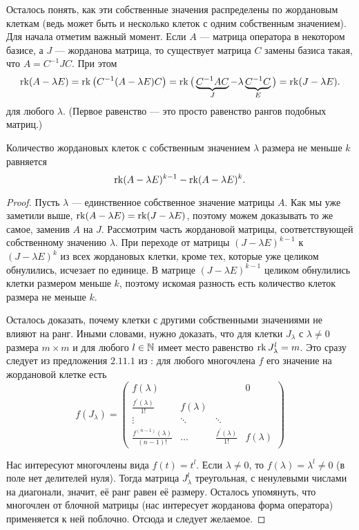 Осталось понять, как эти собственные значения распределены по жордановым клеткам (ведь может быть и несколько клеток с одним собственным значением). Для начала отметим важный момент. Если $A$ --- матрица оператора в некотором базисе, а $J$ --- жорданова матрица, то существует матрица $C$ замены базиса такая, что $A = C^{-1}JC$. При этом
\[
	\operatorname{rk}(A - \lambda E) = \operatorname{rk}\big(C^{-1}(A - \lambda E)C\big) = \operatorname{rk}\big(\underbrace{C^{-1}AC}_{J} - \lambda\underbrace{C^{-1}C}_{E}\big) = \operatorname{rk}(J - \lambda E).
\]
для любого $\lambda$. (Первое равенство --- это просто равенство рангов подобных матриц.)

\begin{lemma}
	Количество жордановых клеток с собственным значением $\lambda$ размера не меньше $k$ равняется
	\[
		\operatorname{rk}(A - \lambda E)^{k - 1} - \operatorname{rk}(A - \lambda E)^k.
	\]
\end{lemma}

\begin{proof}
	Пусть $\lambda$ --- единственное собственное значение матрицы $A$. Как мы уже заметили выше, $\operatorname{rk}(A - \lambda E) = \operatorname{rk}(J - \lambda E)$, поэтому можем доказывать то же самое, заменив $A$ на $J$. Рассмотрим часть жордановой матрицы, соответствующей собственному значению $\lambda$. При переходе от матрицы $(J - \lambda E)^{k - 1}$ к $(J - \lambda E)^k$ из всех жордановых клетки, кроме тех, которые уже целиком обнулились, исчезает по единице. В матрице $(J - \lambda E)^{k - 1}$ целиком обнулились клетки размером меньше $k$, поэтому искомая разность есть количество клеток размера не меньше $k$.

	Осталось доказать, почему клетки с другими собственными значениями не влияют на ранг. Иными словами, нужно доказать, что для клетки $J_\lambda$ с $\lambda \ne 0$ размера $m \times m$ и для любого $l \in \mathbb{N}$ имеет место равенство $\operatorname{rk} J_\lambda^l = m$. Это сразу следует из предложения $2{.}11{.}1$ из \cite{P24}: для любого многочлена $f$ его значение на жордановой клетке есть
	\[
		f(J_\lambda) =
		\begin{pmatrix}
			f(\lambda) & & & 0\\
			\frac{f^\prime(\lambda)}{1!} & f(\lambda) & & \\
			\vdots & \ddots & \ddots & \\
			\frac{f^{(n - 1)}(\lambda)}{(n - 1)!} & \ldots & \frac{f^\prime(\lambda)}{1!} & f(\lambda)
		\end{pmatrix}
	\]

	Нас интересуют многочлены вида $f(t) = t^l$. Если $\lambda \ne 0$, то $f(\lambda) = \lambda^l \ne 0$ (в поле нет делителей нуля). Тогда матрица $J_\lambda^l$ треугольная, с ненулевыми числами на диагонали, значит, её ранг равен её размеру. Осталось упомянуть, что многочлен от блочной матрицы (нас интересует жорданова форма оператора) применяется к ней поблочно. Отсюда и следует желаемое.
\end{proof}

